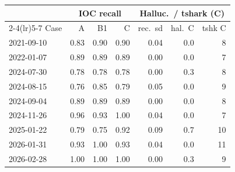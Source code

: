 \begin{tabular}{@{}lrrrrrr@{}}
\toprule
 & \multicolumn{3}{c}{IOC recall} & \multicolumn{3}{c}{Halluc.\ / tshark (C)} \\
\cmidrule(lr){2-4}\cmidrule(lr){5-7}
Case & A & B1 & C & rec.\ sd & hal.\ C & tshk C \\
\midrule
2021-09-10 & 0.83 & 0.90 & 0.90 & 0.04 & 0.0 & 8 \\
2022-01-07 & 0.89 & 0.89 & 0.89 & 0.00 & 0.0 & 7 \\
2024-07-30 & 0.78 & 0.78 & 0.78 & 0.00 & 0.3 & 8 \\
2024-08-15 & 0.76 & 0.85 & 0.79 & 0.05 & 0.0 & 9 \\
2024-09-04 & 0.89 & 0.89 & 0.89 & 0.00 & 0.0 & 8 \\
2024-11-26 & 0.96 & 0.93 & 1.00 & 0.04 & 0.0 & 7 \\
2025-01-22 & 0.79 & 0.75 & 0.92 & 0.09 & 0.7 & 10 \\
2026-01-31 & 0.93 & 1.00 & 0.93 & 0.04 & 0.0 & 11 \\
2026-02-28 & 1.00 & 1.00 & 1.00 & 0.00 & 0.3 & 9 \\
\bottomrule
\end{tabular}